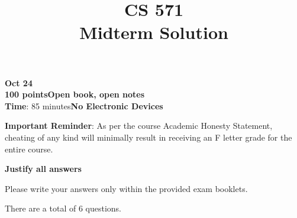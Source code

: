 \documentclass[12pt]{article}
\title{CS 571\\Midterm Solution}
\date{}
\begin{document}
\maketitle

\begin{flushleft}
\textbf{Oct 24}\\
\textbf{100 points}\hfill\textbf{Open book, open notes}\\
\textbf{Time}: 85 minutes\hfill\textbf{No Electronic Devices}\\

\vspace{0.5cm}

\textbf{Important Reminder}: As per the course Academic Honesty
Statement, cheating of any kind will minimally result in receiving an
F letter grade for the entire course.

\textbf{Justify all answers}

Please write your answers only within the provided exam booklets.

\end{flushleft}

There are a total of 6 questions.
\end{document}
